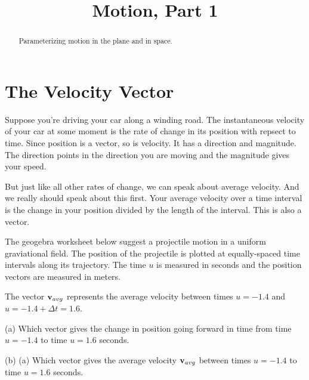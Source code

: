 \documentclass{ximera}
\title{Motion, Part 1}
\begin{document}
\begin{abstract}
Parameterizing motion in the plane and in space. 
\end{abstract}
\maketitle


\section{The Velocity Vector}

\begin{exploration}
Suppose  you're driving your car along a winding road. The instantaneous velocity of your car at some moment is the rate of change in its position with repsect to time. Since position is a vector, so is velocity. It has a direction and magnitude. The direction points in the direction you are moving  and the magnitude gives your speed.

But just like all other rates of change, we can speak about average velocity. And we really should speak about this first. Your average velocity over a time interval is the change in your position divided by the length of the interval. This is also a vector.

The geogebra worksheet below suggest a projectile motion in a uniform graviational field. The position of the projectile is plotted at equally-spaced time intervals along its trajectory. The time $u$ is measured in seconds and the position vectors are measured in meters.

The vector ${\bf v}_{avg}$ represents the average velocity between times $u=-1.4$ and $u=-1.4+\Delta t = 1.6$. 

\begin{question}  \label{Qfdhgyuj:Motion}
(a) Which vector gives the change in position going forward in time from time $u=-1.4$ to time $u=1.6$ seconds. 
\begin{multipleChoice}  
\end{multipleChoice}  


(b) (a) Which vector gives the average velocity ${\bf v}_{avg}$ between times $u=-1.4$ to time $u=1.6$ seconds. 
\begin{multipleChoice}  
\end{multipleChoice}  



\end{question}
\end{exploration}
\end{document}
